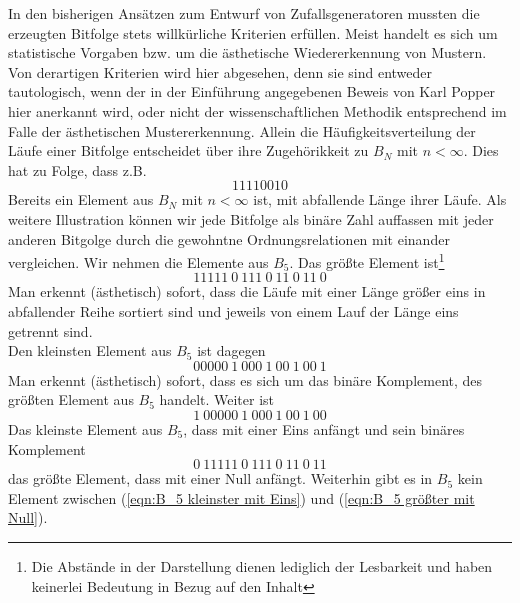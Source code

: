 \documentclass[11pt,oneside,a4paper]{scrreprt}
\begin{document}
\noindent In den bisherigen Ansätzen zum Entwurf von Zufallsgeneratoren mussten die erzeugten Bitfolge stets willkürliche Kriterien erfüllen. Meist handelt es sich um statistische Vorgaben bzw. um die ästhetische Wiedererkennung von Mustern. Von derartigen Kriterien wird hier abgesehen, denn sie sind entweder tautologisch, wenn der in der Einführung angegebenen Beweis von Karl Popper hier anerkannt wird, oder nicht der wissenschaftlichen Methodik entsprechend im Falle der ästhetischen Mustererkennung. Allein die Häufigkeitsverteilung der Läufe einer Bitfolge entscheidet über ihre Zugehörikkeit zu  $B_N$ mit $n<\infty$. Dies hat zu Folge, dass z.B.
\begin{equation}
11110010
\end{equation}
Bereits ein Element aus $B_N$ mit $n<\infty$ ist, mit abfallende Länge ihrer Läufe. Als weitere Illustration können wir jede Bitfolge als binäre Zahl auffassen mit jeder anderen Bitgolge durch die gewohntne Ordnungsrelationen mit einander vergleichen. Wir nehmen die Elemente aus $B_5$. Das größte Element ist\footnote {Die Abstände in der Darstellung dienen lediglich der Lesbarkeit und haben keinerlei Bedeutung in Bezug auf den Inhalt}
\begin{equation}
11111\ 0\ 111\ 0\ 11\ 0\ 11\ 0
\end{equation}
Man erkennt (ästhetisch) sofort, dass die Läufe mit einer Länge größer eins in abfallender Reihe sortiert sind und jeweils von einem Lauf der Länge eins getrennt sind.\\
Den kleinsten Element aus $B_5$ ist dagegen
\begin{equation}
00000\ 1\ 000\ 1\ 00\ 1\ 00\ 1
\end{equation}
Man erkennt (ästhetisch) sofort, dass es sich um das binäre Komplement, des größten Element aus $B_5$ handelt. Weiter ist
\begin{equation}  \label{eqn:B_5 kleinster mit Eins}
1\ 00000\ 1\ 000\ 1\ 00\ 1\ 00
\end{equation}
Das kleinste Element aus $B_5$, dass mit einer Eins anfängt und sein binäres Komplement
\begin{equation} \label{eqn:B_5 größter mit Null}
0\ 11111\ 0\ 111\ 0\ 11\ 0\ 11
\end{equation}
das größte Element, dass mit einer Null anfängt. Weiterhin gibt es in $B_5$ kein Element zwischen 
(\ref{eqn:B_5 kleinster mit Eins}) und (\ref{eqn:B_5 größter mit Null}).\\
\end{document}
